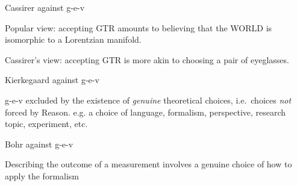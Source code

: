 \documentclass[17pt]{beamer}
\begin{document}
\begin{frame}{\small Cassirer against g-e-v}

Popular view: accepting GTR amounts to believing that the WORLD
is isomorphic to a Lorentzian manifold. 

\bigskip

Cassirer's view: accepting GTR is more akin to choosing a pair of
eyeglasses.



\end{frame}


\begin{frame}{\small Kierkegaard against g-e-v}

  
  g-e-v excluded by the existence of \emph{genuine} theoretical
  choices, i.e.\ choices \emph{not} forced by Reason.  e.g. a choice
  of language, formalism, perspective, research topic, experiment,
  etc.


\end{frame}




\begin{frame}{\small Bohr against g-e-v}


  Describing the outcome of a measurement involves a genuine choice
  of how to apply the formalism

  

\end{frame}  
\end{document}
